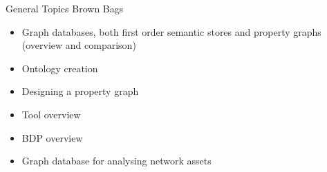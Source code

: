 \documentclass{beamer}
\begin{document}
\begin{frame}{
	\begin{minipage}[t]{0.75\textwidth}
		General Topics Brown Bags
	\end{minipage}
	\hfill
	\begin{minipage}[t]{0.25\textwidth}
		\flushright
	\end{minipage}
}{}
\begin{itemize}
	\item Graph databases, both first order semantic stores and property graphs (overview and comparison)
	\item Ontology creation
	\item Designing a property graph
	\item Tool overview
	\item BDP overview
	\item Graph database for analysing network assets
\end{itemize}

\end{frame}
\end{document}
